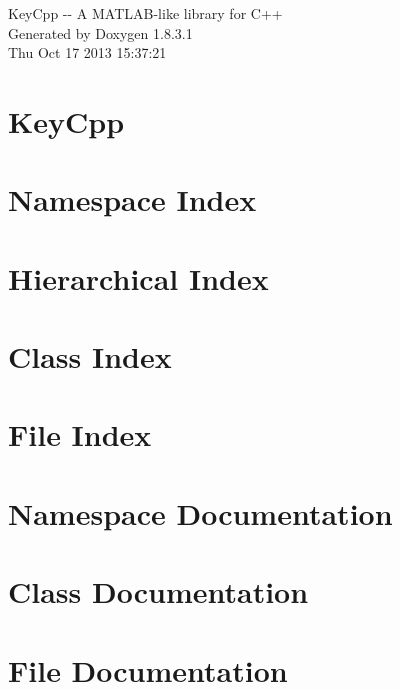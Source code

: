 \documentclass{book}
\begin{document}
\hypersetup{pageanchor=false,citecolor=blue}
\begin{titlepage}
\vspace*{7cm}
\begin{center}
{\Large Key\-Cpp -\/-\/ A M\-A\-T\-L\-A\-B-\/like library for C++ }\\
\vspace*{1cm}
{\large Generated by Doxygen 1.8.3.1}\\
\vspace*{0.5cm}
{\small Thu Oct 17 2013 15:37:21}\\
\end{center}
\end{titlepage}
\clearemptydoublepage
{}
\tableofcontents
\clearemptydoublepage
{}
\hypersetup{pageanchor=true,citecolor=blue}
\chapter{Key\-Cpp}
\label{index}\hypertarget{index}{}
\chapter{Namespace Index}

\chapter{Hierarchical Index}

\chapter{Class Index}

\chapter{File Index}

\chapter{Namespace Documentation}

\chapter{Class Documentation}
























\chapter{File Documentation}

\printindex
\end{document}
